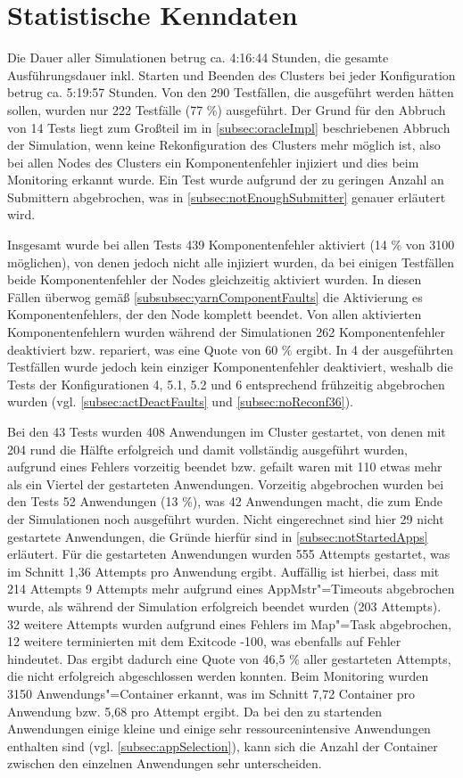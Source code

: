 \section{Statistische Kenndaten}
\label{sec:evaluationStats}

Die Dauer aller Simulationen betrug ca. 4:16:44 Stunden, die gesamte Ausführungsdauer inkl. Starten und Beenden des Clusters bei jeder Konfiguration betrug ca. 5:19:57 Stunden.
Von den 290 Testfällen, die ausgeführt werden hätten sollen, wurden nur 222 Testfälle (77 \%) ausgeführt.
Der Grund für den Abbruch von 14 Tests liegt zum Großteil im in \cref{subsec:oracleImpl} beschriebenen Abbruch der Simulation, wenn keine Rekonfiguration des Clusters mehr möglich ist, also bei allen Nodes des Clusters ein Komponentenfehler injiziert und dies beim Monitoring erkannt wurde.
Ein Test wurde aufgrund der zu geringen Anzahl an Submittern abgebrochen, was in \cref{subsec:notEnoughSubmitter} genauer erläutert wird.

Insgesamt wurde bei allen Tests 439 Komponentenfehler aktiviert (14 \% von 3100 möglichen), von denen jedoch nicht alle injiziert wurden, da bei einigen Testfällen beide Komponentenfehler der Nodes gleichzeitig aktiviert wurden.
In diesen Fällen überwog gemäß \cref{subsubsec:yarnComponentFaults} die Aktivierung es Komponentenfehlers, der den Node komplett beendet.
Von allen aktivierten Komponentenfehlern wurden während der Simulationen 262 Komponentenfehler deaktiviert bzw. repariert, was eine Quote von 60 \% ergibt.
In 4 der ausgeführten Testfällen wurde jedoch kein einziger Komponentenfehler deaktiviert, weshalb die Tests der Konfigurationen 4, 5.1, 5.2 und 6 entsprechend frühzeitig abgebrochen wurden (vgl. \cref{subsec:actDeactFaults} und \cref{subsec:noReconf36}).

Bei den 43 Tests wurden 408 Anwendungen im Cluster gestartet, von denen mit 204 rund die Hälfte erfolgreich und damit vollständig ausgeführt wurden, aufgrund eines Fehlers vorzeitig beendet bzw. gefailt waren mit 110 etwas mehr als ein Viertel der gestarteten Anwendungen.
Vorzeitig abgebrochen wurden bei den Tests 52 Anwendungen (13 \%), was 42 Anwendungen macht, die zum Ende der Simulationen noch ausgeführt wurden.
Nicht eingerechnet sind hier 29 nicht gestartete Anwendungen, die Gründe hierfür sind in \cref{subsec:notStartedApps} erläutert.
Für die gestarteten Anwendungen wurden 555 Attempts gestartet, was im Schnitt 1,36 Attempts pro Anwendung ergibt.
Auffällig ist hierbei, dass mit 214 Attempts 9 Attempts mehr aufgrund eines \ac{AppMstr}"=Timeouts abgebrochen wurde, als während der Simulation erfolgreich beendet wurden (203 Attempts).
32 weitere Attempts wurden aufgrund eines Fehlers im Map"=Task abgebrochen, 12 weitere terminierten mit dem Exitcode -100, was ebenfalls auf Fehler hindeutet.
Das ergibt dadurch eine Quote von 46,5 \% aller gestarteten Attempts, die nicht erfolgreich abgeschlossen werden konnten.
Beim Monitoring wurden 3150 Anwendungs"=Container erkannt, was im Schnitt 7,72 Container pro Anwendung bzw. 5,68 pro Attempt ergibt.
Da bei den zu startenden Anwendungen einige kleine und einige sehr ressourcenintensive Anwendungen enthalten sind (vgl. \cref{subsec:appSelection}), kann sich die Anzahl der Container zwischen den einzelnen Anwendungen sehr unterscheiden.


